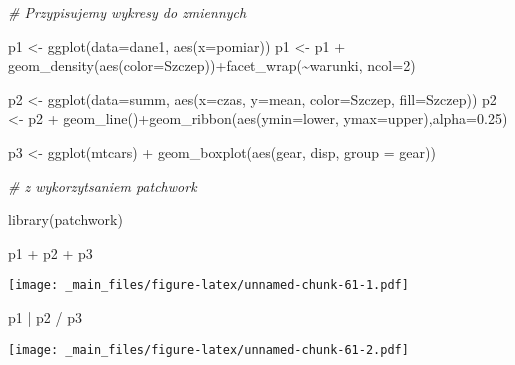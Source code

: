 \documentclass[
]{book}
\newenvironment{Shaded}{\begin{snugshade}}{\end{snugshade}}
\newcommand{\AttributeTok}[1]{\textcolor[rgb]{0.77,0.63,0.00}{#1}}
\newcommand{\CommentTok}[1]{\textcolor[rgb]{0.56,0.35,0.01}{\textit{#1}}}
\newcommand{\DecValTok}[1]{\textcolor[rgb]{0.00,0.00,0.81}{#1}}
\newcommand{\FloatTok}[1]{\textcolor[rgb]{0.00,0.00,0.81}{#1}}
\newcommand{\FunctionTok}[1]{\textcolor[rgb]{0.00,0.00,0.00}{#1}}
\newcommand{\NormalTok}[1]{#1}
\newcommand{\OtherTok}[1]{\textcolor[rgb]{0.56,0.35,0.01}{#1}}
\newcommand{\SpecialCharTok}[1]{\textcolor[rgb]{0.00,0.00,0.00}{#1}}
\begin{document}
\begin{Shaded}
\begin{Highlighting}[]
\CommentTok{\# Przypisujemy wykresy do zmiennych}

\NormalTok{p1 }\OtherTok{\textless{}{-}} \FunctionTok{ggplot}\NormalTok{(}\AttributeTok{data=}\NormalTok{dane1, }\FunctionTok{aes}\NormalTok{(}\AttributeTok{x=}\NormalTok{pomiar))}
\NormalTok{p1 }\OtherTok{\textless{}{-}}\NormalTok{ p1 }\SpecialCharTok{+} \FunctionTok{geom\_density}\NormalTok{(}\FunctionTok{aes}\NormalTok{(}\AttributeTok{color=}\NormalTok{Szczep))}\SpecialCharTok{+}\FunctionTok{facet\_wrap}\NormalTok{(}\SpecialCharTok{\textasciitilde{}}\NormalTok{warunki, }\AttributeTok{ncol=}\DecValTok{2}\NormalTok{)}

\NormalTok{p2 }\OtherTok{\textless{}{-}} \FunctionTok{ggplot}\NormalTok{(}\AttributeTok{data=}\NormalTok{summ, }\FunctionTok{aes}\NormalTok{(}\AttributeTok{x=}\NormalTok{czas, }\AttributeTok{y=}\NormalTok{mean, }\AttributeTok{color=}\NormalTok{Szczep, }\AttributeTok{fill=}\NormalTok{Szczep))}
\NormalTok{p2 }\OtherTok{\textless{}{-}}\NormalTok{ p2 }\SpecialCharTok{+} \FunctionTok{geom\_line}\NormalTok{()}\SpecialCharTok{+}\FunctionTok{geom\_ribbon}\NormalTok{(}\FunctionTok{aes}\NormalTok{(}\AttributeTok{ymin=}\NormalTok{lower, }\AttributeTok{ymax=}\NormalTok{upper),}\AttributeTok{alpha=}\FloatTok{0.25}\NormalTok{)}

\NormalTok{p3 }\OtherTok{\textless{}{-}} \FunctionTok{ggplot}\NormalTok{(mtcars) }\SpecialCharTok{+} \FunctionTok{geom\_boxplot}\NormalTok{(}\FunctionTok{aes}\NormalTok{(gear, disp, }\AttributeTok{group =}\NormalTok{ gear))}

\CommentTok{\# z wykorzytsaniem patchwork}

\FunctionTok{library}\NormalTok{(patchwork)}

\NormalTok{p1 }\SpecialCharTok{+}\NormalTok{ p2 }\SpecialCharTok{+}\NormalTok{ p3}
\end{Highlighting}
\end{Shaded}

\texttt{[image: \_main\_files/figure-latex/unnamed-chunk-61-1.pdf]}

\begin{Shaded}
\begin{Highlighting}[]
\NormalTok{p1 }\SpecialCharTok{|}\NormalTok{ p2 }\SpecialCharTok{/}\NormalTok{ p3}
\end{Highlighting}
\end{Shaded}

\texttt{[image: \_main\_files/figure-latex/unnamed-chunk-61-2.pdf]}
\end{document}
